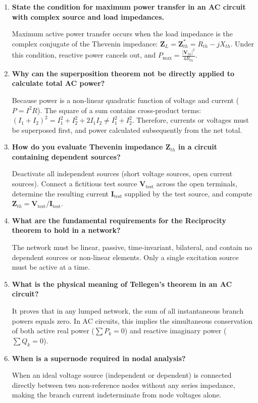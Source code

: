 \documentclass[12pt,a4paper]{article}
\newcommand{\Q}[1]{\textbf{#1}\par\noindent\ignorespaces}
\begin{document}
\begin{tcolorbox}[exambox, title={\textbf{Frequently Asked / Viva Questions}}]
\begin{enumerate}[topsep=0pt, label=\textbf{Q\arabic*.}, itemsep=5pt]
  \item \Q{State the condition for maximum power transfer in an AC circuit with complex source and load impedances.}
  Maximum active power transfer occurs when the load impedance is the complex conjugate of the Thevenin impedance: $\mathbf{Z}_L = \mathbf{Z}_{th}^* = R_{th} - jX_{th}$. Under this condition, reactive power cancels out, and $P_{\max} = \frac{|\mathbf{V}_{th}|^2}{4 R_{th}}$.

  \item \Q{Why can the superposition theorem not be directly applied to calculate total AC power?}
  Because power is a non-linear quadratic function of voltage and current ($P = I^2 R$). The square of a sum contains cross-product terms: $(I_1 + I_2)^2 = I_1^2 + I_2^2 + 2 I_1 I_2 \ne I_1^2 + I_2^2$. Therefore, currents or voltages must be superposed first, and power calculated subsequently from the net total.

  \item \Q{How do you evaluate Thevenin impedance $\mathbf{Z}_{th}$ in a circuit containing dependent sources?}
  Deactivate all independent sources (short voltage sources, open current sources). Connect a fictitious test source $\mathbf{V}_{\text{test}}$ across the open terminals, determine the resulting current $\mathbf{I}_{\text{test}}$ supplied by the test source, and compute $\mathbf{Z}_{th} = \mathbf{V}_{\text{test}} / \mathbf{I}_{\text{test}}$.

  \item \Q{What are the fundamental requirements for the Reciprocity theorem to hold in a network?}
  The network must be linear, passive, time-invariant, bilateral, and contain no dependent sources or non-linear elements. Only a single excitation source must be active at a time.

  \item \Q{What is the physical meaning of Tellegen's theorem in an AC circuit?}
  It proves that in any lumped network, the sum of all instantaneous branch powers equals zero. In AC circuits, this implies the simultaneous conservation of both active real power ($\sum P_k = 0$) and reactive imaginary power ($\sum Q_k = 0$).

  \item \Q{When is a supernode required in nodal analysis?}
  When an ideal voltage source (independent or dependent) is connected directly between two non-reference nodes without any series impedance, making the branch current indeterminate from node voltages alone.


\end{enumerate}
\end{tcolorbox}
\end{document}
